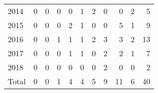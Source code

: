 \documentclass[a4paper]{article}
\begin{document}
\begin{table}
{\begin{tabular}[t]{lrrrrrrrrrr}
\hspace{1em}\hspace{1em}2014 & 0 & 0 & 0 & 0 & 1 & 2 & 0 & 0 & 2 & 5\\
\hspace{1em}\hspace{1em}2015 & 0 & 0 & 0 & 2 & 1 & 0 & 0 & 5 & 1 & 9\\
\hspace{1em}\hspace{1em}2016 & 0 & 0 & 1 & 1 & 1 & 2 & 3 & 3 & 2 & 13\\
\hspace{1em}\hspace{1em}2017 & 0 & 0 & 0 & 1 & 1 & 0 & 2 & 2 & 1 & 7\\
\hspace{1em}\hspace{1em}2018 & 0 & 0 & 0 & 0 & 0 & 0 & 2 & 0 & 0 & 2\\
\hspace{1em}\hspace{1em}Total & 0 & 0 & 1 & 4 & 4 & 5 & 9 & 11 & 6 & 40\\
\bottomrule
\end{tabular}}
\end{table}
\end{document}
